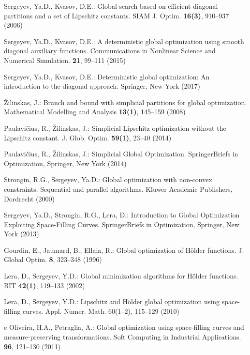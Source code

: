 \begin{thebibliography}{99.}

Sergeyev, Ya.D., Kvasov, D.E.: Global search based on efficient diagonal partitions and a set of Lipschitz constants. SIAM J. Optim. \textbf{16(3)}, 910--937 (2006)

Sergeyev, Ya.D., Kvasov, D.E.: A deterministic global optimization using smooth diagonal auxiliary functions. Communications in Nonlinear Science and Numerical Simulation. \textbf{21}, 99--111 (2015)

Sergeyev, Ya.D., Kvasov, D.E.: Deterministic global optimization: An introduction to the diagonal approach. Springer, New York (2017)

\v{Z}ilinskas, J.: Branch and bound with simplicial partitions for global optimization. Mathematical Modelling and Analysis \textbf{13(1)}, 145--159 (2008)

Paulavi\v{c}ius, R., \v{Z}ilinskas, J.: Simplicial Lipschitz optimization without the Lipschitz constant. J. Glob. Optim. \textbf{59(1)}, 23--40  (2014)

Paulavi\v{c}ius, R., \v{Z}ilinskas, J.: Simplicial Global Optimization. SpringerBriefs in Optimization, Springer, New York (2014)

Strongin, R.G., Sergeyev, Ya.D.: Global optimization with non-convex constraints. Sequential and parallel algorithms. Kluwer Academic Publishers, Dordrecht (2000)

Sergeyev, Ya.D., Strongin, R.G., Lera, D.: Introduction to Global Optimization Exploiting Space-Filling Curves. SpringerBriefs in Optimization, Springer, New York (2013)

Gourdin, E., Jaumard, B., Ellaia, R.: Global optimization of H\"{o}lder functions. J. Global Optim. \textbf{8}, 323--348 (1996)

Lera, D., Sergeyev, Y.D.: Global minimization algorithms for H\"{o}lder functions. BIT \textbf{42(1)}, 119--133 (2002)

Lera, D., Sergeyev, Y.D.: Lipschitz and H\"{o}lder global optimization using space-filling curves. Appl. Numer. Math. 60(1–2), 115–129 (2010)

e Oliveira, H.A., Petraglia, A.: Global optimization using space-filling curves and measure-preserving transformations. Soft Computing in Industrial Applications. \textbf{96}, 121--130 (2011)


\end{thebibliography}

